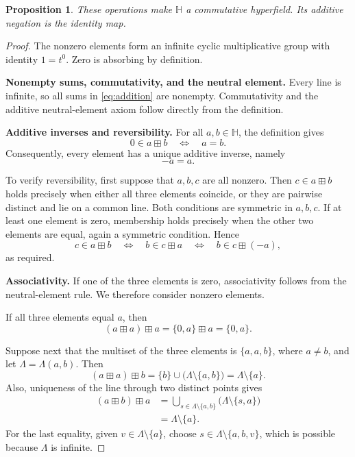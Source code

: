 \documentclass[11pt]{article}
\newcommand{\HH}{\mathbb{H}}
\newtheorem{proposition}[theorem]{Proposition}
\begin{document}
\begin{proposition}\label{prop:hyperfield}
These operations make \(\HH\) a commutative hyperfield. Its additive
negation is the identity map.
\end{proposition}

\begin{proof}
The nonzero elements form an infinite cyclic multiplicative group with
identity \(1=t^0\). Zero is absorbing by definition.

\medskip
\noindent
\textbf{Nonempty sums, commutativity, and the neutral element.}
Every line is infinite, so all sums in \eqref{eq:addition} are nonempty.
Commutativity and the additive neutral-element axiom follow directly from
the definition.

\medskip
\noindent
\textbf{Additive inverses and reversibility.}
For all \(a,b\in\HH\), the definition gives
\begin{equation}\label{eq:inverse}
    0\in a\boxplus b
    \quad\Longleftrightarrow\quad a=b.
\end{equation}
Consequently, every element has a unique additive inverse, namely
\[
    -a=a.
\]

To verify reversibility, first suppose that \(a,b,c\) are all nonzero.
Then \(c\in a\boxplus b\) holds precisely when either all three elements
coincide, or they are pairwise distinct and lie on a common line.
Both conditions are symmetric in \(a,b,c\).
If at least one element is zero, membership holds precisely when the
other two elements are equal, again a symmetric condition. Hence
\[
    c\in a\boxplus b
    \quad\Longleftrightarrow\quad
    b\in c\boxplus a
    \quad\Longleftrightarrow\quad
    b\in c\boxplus(-a),
\]
as required.

\medskip
\noindent
\textbf{Associativity.}
If one of the three elements is zero, associativity follows from the
neutral-element rule. We therefore consider nonzero elements.

If all three elements equal \(a\), then
\[
    (a\boxplus a)\boxplus a
    =\{0,a\}\boxplus a
    =\{0,a\}.
\]

Suppose next that the multiset of the three elements is
\(\{a,a,b\}\), where \(a\neq b\), and let
\(\Lambda=\Lambda(a,b)\). Then
\[
    (a\boxplus a)\boxplus b
    =\{b\}\cup\bigl(\Lambda\setminus\{a,b\}\bigr)
    =\Lambda\setminus\{a\}.
\]
Also, uniqueness of the line through two distinct points gives
\[
\begin{split}
    (a\boxplus b)\boxplus a
    &=
    \bigcup_{s\in\Lambda\setminus\{a,b\}}
        \bigl(\Lambda\setminus\{s,a\}\bigr)\\
    &=\Lambda\setminus\{a\}.
\end{split}
\]
For the last equality, given \(v\in\Lambda\setminus\{a\}\), choose
\(s\in\Lambda\setminus\{a,b,v\}\), which is possible because
\(\Lambda\) is infinite.


\end{proof}
\end{document}
